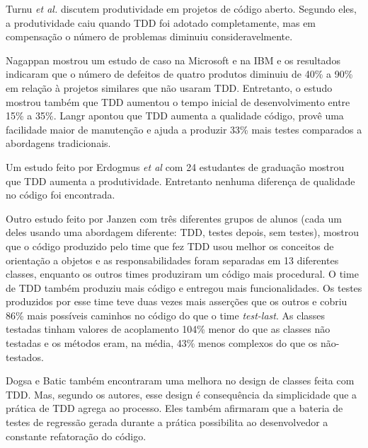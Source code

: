 Turnu \textit{et al.} \cite{turnu-tdd-opensouce} discutem produtividade em
projetos de código aberto. Segundo eles, a produtividade caiu quando TDD foi
adotado completamente, mas em compensação o número de problemas diminuiu 
consideravelmente.

Nagappan \cite{nagappan-ms} mostrou um estudo de caso na Microsoft e na IBM e os
resultados indicaram que o número de defeitos de quatro produtos diminuiu de 
40\% a 90\% em relação à projetos similares que não usaram TDD. Entretanto, o 
estudo mostrou também que TDD aumentou o tempo inicial de desenvolvimento entre 15\%
a 35\%. Langr \cite{langr} apontou que TDD aumenta a qualidade código, provê uma 
facilidade maior de manutenção e ajuda a produzir 33\% mais testes comparados  a
abordagens tradicionais.

Um estudo feito por Erdogmus \textit{et al} \cite{erdogmus-morisio} com 24 estudantes de
graduação mostrou que TDD aumenta a produtividade. Entretanto nenhuma diferença 
de qualidade no código foi encontrada.

Outro estudo feito por Janzen \cite{janzen-saiedian} com três diferentes grupos
de alunos (cada um deles usando uma abordagem diferente: TDD, testes depois, sem
testes), mostrou que o código produzido pelo time que fez TDD usou melhor os
conceitos de orientação a objetos e as responsabilidades foram separadas em 13 
diferentes classes, enquanto os outros times produziram um código mais
procedural. O time de TDD também produziu mais código e entregou mais
funcionalidades. Os testes produzidos por esse time teve duas vezes mais
asserções que os outros e cobriu 86\% mais possíveis caminhos no código 
do que o time \textit{test-last}. 
As classes testadas tinham valores de acoplamento 104\% menor do 
que as classes não testadas e os métodos eram, na média, 43\% menos complexos 
do que os não-testados.

Dogsa e Batic \cite{dogsa-batic} também encontraram uma melhora no
design de classes feita com TDD. Mas, segundo os autores, esse design é 
consequência da simplicidade que a prática de TDD agrega ao processo. Eles
também  afirmaram que a bateria de testes de regressão gerada durante a prática 
possibilita ao desenvolvedor a constante refatoração do código.

